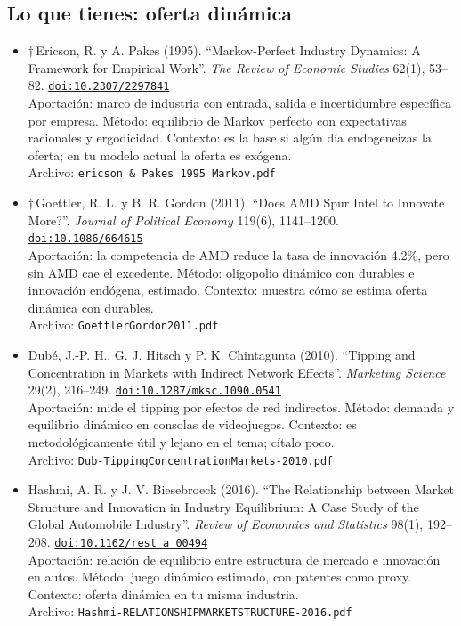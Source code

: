 \documentclass[11pt]{article}
\begin{document}
\subsection*{Lo que tienes: oferta dinámica}
\begin{itemize}
\item $\dagger$\,Ericson, R. y A. Pakes (1995). ``Markov-Perfect Industry Dynamics: A Framework for Empirical Work''. \textit{The Review of Economic Studies} 62(1), 53--82. \href{https://doi.org/10.2307/2297841}{\texttt{doi:10.2307/2297841}}\\
Aportación: marco de industria con entrada, salida e incertidumbre específica por empresa. Método: equilibrio de Markov perfecto con expectativas racionales y ergodicidad. Contexto: es la base si algún día endogeneizas la oferta; en tu modelo actual la oferta es exógena.\\
{\footnotesize Archivo: \texttt{ericson \& Pakes 1995 Markov.pdf}}
\item $\dagger$\,Goettler, R. L. y B. R. Gordon (2011). ``Does AMD Spur Intel to Innovate More?''. \textit{Journal of Political Economy} 119(6), 1141--1200. \href{https://doi.org/10.1086/664615}{\texttt{doi:10.1086/664615}}\\
Aportación: la competencia de AMD reduce la tasa de innovación 4.2\%, pero sin AMD cae el excedente. Método: oligopolio dinámico con durables e innovación endógena, estimado. Contexto: muestra cómo se estima oferta dinámica con durables.\\
{\footnotesize Archivo: \texttt{GoettlerGordon2011.pdf}}
\item Dubé, J.-P. H., G. J. Hitsch y P. K. Chintagunta (2010). ``Tipping and Concentration in Markets with Indirect Network Effects''. \textit{Marketing Science} 29(2), 216--249. \href{https://doi.org/10.1287/mksc.1090.0541}{\texttt{doi:10.1287/mksc.1090.0541}}\\
Aportación: mide el tipping por efectos de red indirectos. Método: demanda y equilibrio dinámico en consolas de videojuegos. Contexto: es metodológicamente útil y lejano en el tema; cítalo poco.\\
{\footnotesize Archivo: \texttt{Dub-TippingConcentrationMarkets-2010.pdf}}
\item Hashmi, A. R. y J. V. Biesebroeck (2016). ``The Relationship between Market Structure and Innovation in Industry Equilibrium: A Case Study of the Global Automobile Industry''. \textit{Review of Economics and Statistics} 98(1), 192--208. \href{https://doi.org/10.1162/rest\_a\_00494}{\texttt{doi:10.1162/rest\_a\_00494}}\\
Aportación: relación de equilibrio entre estructura de mercado e innovación en autos. Método: juego dinámico estimado, con patentes como proxy. Contexto: oferta dinámica en tu misma industria.\\
{\footnotesize Archivo: \texttt{Hashmi-RELATIONSHIPMARKETSTRUCTURE-2016.pdf}}
\end{itemize}
\end{document}
